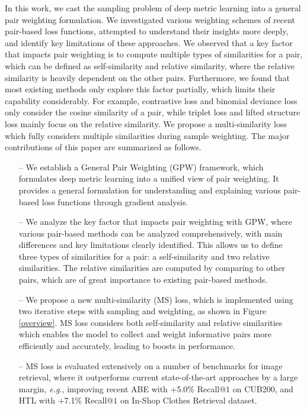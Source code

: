 \documentclass[10pt,twocolumn,letterpaper]{article}
\begin{document}
In this work, we cast the sampling problem of deep metric learning into a general pair weighting formulation. We investigated various weighting schemes of recent pair-based loss functions, attempted to understand their insights more deeply, and identify key limitations of these approaches. 
We observed that a key factor that impacts pair weighting is to compute multiple types of similarities for a pair, which can be defined  as self-similarity and relative similarity, where the relative similarity is heavily dependent on the other pairs. 
Furthermore, we found that most existing methods only explore this factor partially, which limits their capability considerably. For example, contrastive loss \cite{contrastive} and binomial deviance loss \cite{binomial} only consider the cosine similarity of a pair, while triplet loss \cite{Hoffer2015DeepML} and lifted structure loss \cite{lifted-structured-loss} mainly focus on the relative similarity. We propose a multi-similarity loss which fully considers multiple similarities during sample weighting. The major contributions of this paper are summarized as follows.  
\begin{itemize}
\item[--] We establish a General Pair Weighting (GPW) framework, which formulates deep metric learning into a unified view of pair weighting. It provides a general formulation for understanding and explaining various pair-based loss functions through gradient analysis.
\item[--] We analyze the key factor that impacts pair weighting with GPW, where various pair-based methods can be analyzed comprehensively, with main differences and key limitations clearly identified. This allows us to define three types of similarities for a pair: a self-similarity and two relative similarities. The relative similarities are computed by comparing to other pairs, which are of great importance to existing pair-based methods. 
\item[--] We propose a new multi-similarity (MS) loss,  which is implemented using two iterative steps with sampling and weighting, as shown in Figure \ref{overview}. MS loss considers both self-similarity and relative similarities which enables the model to collect and weight informative pairs more efficiently and accurately, leading to boosts in performance.
\item[--] MS loss is evaluated extensively on a number of benchmarks for image retrieval,
where it outperforms current state-of-the-art approaches by a large margin, {\it e.g.}, improving recent  ABE \cite{Kim_2018_ECCV} with +5.0\% Recall@$1$ on CUB200, and HTL \cite{HTL} with +7.1\% Recall@$1$ on In-Shop Clothes Retrieval dataset.

\end{itemize}
\end{document}
